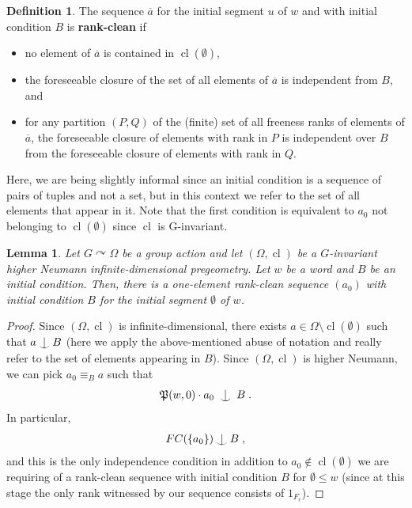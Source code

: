 \documentclass{article}
\newtheorem{lemma}[theorem]{Lemma}
\theoremstyle{remark}
\theoremstyle{definition}
\newtheorem{definition}[theorem]{Definition}
\def\acts{\curvearrowright}
\DeclareMathOperator{\cl}{cl}
\def\Ind#1#2{#1\setbox0=\hbox{$#1x$}\kern\wd0\hbox to 0pt{\hss$#1\mid$\hss}
	\lower.9\ht0\hbox to 0pt{\hss$#1\smile$\hss}\kern\wd0}
\def\ind{\mathop{\mathpalette\Ind{}}}
\begin{document}
{\begin{definition}
The sequence $\overline{a}$ for the initial segment $u$ of $w$ and with initial condition $B$ is \textbf{rank-clean}  {if} 
\begin{itemize}
    \item no element of $\overline{a}$ is contained in ${\cl}(\emptyset)$,
    \item 
    {the foreseeable closure of the set of all elements of $\overline{a}$}  %
     is independent from $B$, and
    \item for any partition $(P,Q)$ of the (finite) set of all freeness ranks of elements of $\overline{a}$, the foreseeable closure of elements with rank in $P$ is independent over $B$ from the foreseeable closure of elements with rank in $Q$.
\end{itemize}
Here, we are {being slightly informal} %
 since an initial condition is a sequence of pairs of tuples and not a set, but in this {context} we refer to the set of all elements that appear in it. Note that {the first condition is equivalent to $a_0$ not belonging to  ${\cl}(\emptyset)$ since
${\cl}$ is G-invariant.}
\end{definition}

\begin{lemma}\label{lem:basecase} {Let $G\acts \Omega$ be a group action and let  $(\Omega, {\cl})$ be a {$G$-invariant} higher Neumann  infinite-dimensional  pregeometry.} Let $w$ be a 
{word} and $B$ be {an} initial condition. Then, there  is a one-element rank-clean sequence $(a_0)$ with initial condition $B$ for the initial segment $\emptyset$ of $w$.
\end{lemma}
\begin{proof} 
{Since $(\Omega,{\cl})$ is infinite-dimensional, there exists $a\in\Omega {\setminus {\cl}(\emptyset)}$ such that $a\ind B$ (here we apply the above-mentioned abuse of notation and really refer to the set of  elements appearing in $B$). Since $(\Omega,{\cl})$ is higher Neumann,} we can pick $a_0\equiv_B a$ such that
\[\mathfrak{P}(w, 0)\cdot  a_0\;\ind\;  B\;.\]
In particular, 
\[FC(\{a_0\})\ind B\;,\]
and this is the only independence condition {in addition to $a_0\notin {\cl}(\emptyset)$} we are requiring of a rank-clean sequence with initial condition $B$ for $\emptyset\leq w$ (since at this stage the only rank witnessed by our sequence consists of $1_{F_r}$). 
\end{proof}



}
\end{document}
